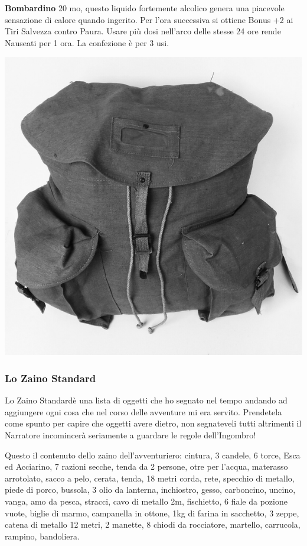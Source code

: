 \begin{multicols}{2}
\textbf{Bombardino} 20 mo, questo liquido fortemente alcolico genera una piacevole sensazione di calore quando ingerito. Per l'ora successiva si ottiene Bonus +2 ai Tiri Salvezza contro Paura. Usare più dosi nell'arco delle stesse 24 ore rende Nauseati per 1 ora. La confezione è per 3 usi.

\begin{center}
\includegraphics[width=0.7\linewidth]{immagini/zaino.png}
\end{center}

\subsubsection{Lo Zaino Standard}

Lo Zaino Standard\textregistered \space è una lista di oggetti che ho segnato nel tempo andando ad aggiungere ogni cosa che nel corso delle avventure mi era servito.
Prendetela come spunto per capire che oggetti avere dietro, non segnateveli tutti altrimenti il Narratore incomincerà seriamente a guardare le regole dell'Ingombro!

Questo il contenuto dello zaino dell'avventuriero: cintura, 3 candele, 6 torce, Esca ed Acciarino, 7 razioni secche, tenda da 2 persone, otre per l'acqua, materasso arrotolato, sacco a pelo, cerata, tenda, 18 metri corda, rete, specchio di metallo, piede di porco, bussola, 3 olio da lanterna, inchiostro, gesso, carboncino, uncino, vanga, amo da pesca, stracci, cavo di metallo 2m, fischietto, 6 fiale da pozione vuote, biglie di marmo, campanella in ottone, 1kg di farina in sacchetto, 3 zeppe, catena di metallo 12 metri, 2 manette, 8 chiodi da rocciatore, martello, carrucola, rampino, bandoliera.


\end{multicols}
